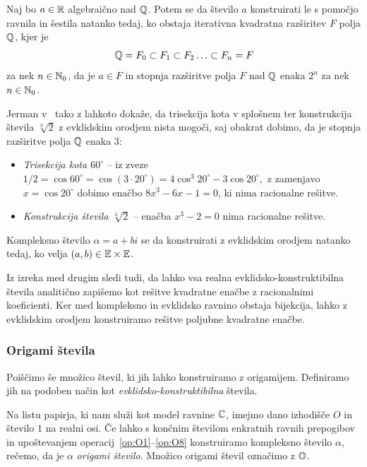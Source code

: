 \begin{izrek}
    \label{izr:evkl_konstr}
    Naj bo $a \in \mathbb R$ algebraično nad $\mathbb Q$. Potem se da število $a$ konstruirati le s pomočjo ravnila in šestila natanko tedaj, ko obstaja iterativna kvadratna razširitev $F$ polja $\mathbb Q$, kjer je
    $$ \mathbb Q = F_0 \subset F_1 \subset F_2 \ldots \subset F_n = F$$
    za nek $n \in \mathbb N_0$, da je $a \in F$ in stopnja razširitve polja $F$ nad $\mathbb Q$ enaka $2^n$ za nek $n \in \mathbb N_0$.
\end{izrek}

Jerman v~\cite[str.\ 77--78]{jerman1998} tako z lahkoto dokaže, da trisekcija kota v splošnem ter konstrukcija števila $ \sqrt[3]{2} $ z evklidskim orodjem nista mogoči, saj obakrat dobimo, da je stopnja razširitve polja $\mathbb Q$ enaka $3$:
\begin{itemize}
    \label{dokaz_trisekcija}
    \item \emph{Trisekcija kota $60^\circ$} -- iz zveze $ 1/2 = \cos 60^\circ = \cos(3 \cdot 20^\circ) = 4 \cos^3 20^\circ - 3 \cos 20^\circ, $ z zamenjavo $x = \cos 20^\circ$ dobimo enačbo $8 x^3 - 6x - 1 = 0$, ki nima racionalne rešitve.
    \item \emph{Konstrukcija števila $\sqrt[3]{2}$} -- enačba $x^3 - 2 = 0$ nima racionalne rešitve.
\end{itemize}

\begin{posledica}
    Kompleksno število $\alpha = a + bi$ se da konstruirati z evklidskim orodjem natanko tedaj, ko velja $(a, b) \in \mathbb E \times \mathbb E$.
\end{posledica}

Iz izreka med drugim sledi tudi, da lahko vsa realna evklidsko-konstruktibilna števila analitično zapišemo kot rešitve kvadratne enačbe z racionalnimi koeficienti. Ker med kompleksno in evklidsko ravnino obstaja bijekcija, lahko z evklidskim orodjem konstruiramo rešitve poljubne kvadratne enačbe.

\subsubsection{Origami števila}
\label{origami_konstruktibilnost}

Poiščimo še množico števil, ki jih lahko konstruiramo z origamijem. Definiramo jih na podoben način kot \emph{evklidsko-konstruktibilna} števila.

\begin{definicija}
    \label{def:origami_stevilo}
    Na listu papirja, ki nam služi kot model ravnine $\mathbb C$, imejmo dano izhodišče $O$ in število $1$ na realni osi. Če lahko s končnim številom enkratnih ravnih prepogibov in upoštevanjem operacij~\ref{op:O1}--\ref{op:O8} konstruiramo kompleksno število $\alpha$, rečemo, da je $\alpha$ \emph{origami število}. Množico origami števil označimo z $\mathbb O$.
\end{definicija}

